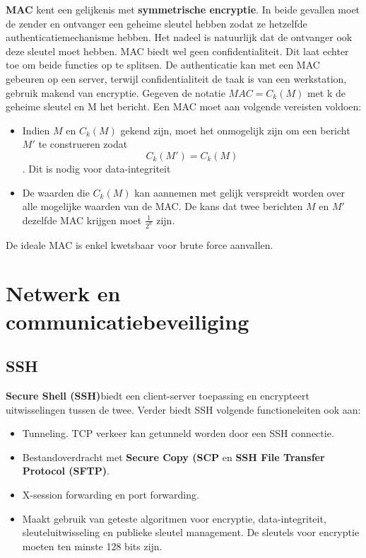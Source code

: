 	\textbf{MAC} kent een gelijkenis met \textbf{symmetrische encryptie}. In beide gevallen moet de zender en ontvanger een geheime sleutel hebben zodat ze hetzelfde authenticatiemechanisme hebben. Het nadeel is natuurlijk dat de ontvanger ook deze sleutel moet hebben. MAC biedt wel geen confidentialiteit. Dit laat echter toe om beide functies op te splitsen. De authenticatie kan met een MAC gebeuren op een server, terwijl confidentialiteit de taak is van een werkstation, gebruik makend van encryptie. Gegeven de notatie \textbf{$MAC = C_k(M)$} met k de geheime sleutel en M het bericht. Een MAC moet aan volgende vereisten voldoen:
	\begin{itemize}
		\item Indien $M$ en $C_k(M)$ gekend zijn, moet het onmogelijk zijn om een bericht $M'$ te construeren zodat \textbf{$$C_k(M') = C_k(M)$$}. Dit is nodig voor data-integriteit
		
		\item De waarden die $C_k(M)$ kan aannemen met gelijk verspreidt worden over alle mogelijke waarden van de MAC. De kans dat twee berichten $M$ en $M'$ dezelfde MAC krijgen moet $\frac{1}{2^n}$ zijn.
	\end{itemize}

	De ideale MAC is enkel kwetsbaar voor brute force aanvallen. 

	\chapter{Netwerk en communicatiebeveiliging}
	\section{SSH}
	\textbf{Secure Shell (SSH)}biedt een client-server toepassing en encrypteert uitwisselingen tussen de twee. Verder biedt SSH volgende functioneleiten ook aan:
	\begin{itemize}
		\item Tunneling. TCP verkeer kan getunneld worden door een SSH connectie.
		\item Bestandoverdracht met \textbf{Secure Copy (SCP} en \textbf{SSH File Transfer Protocol (SFTP)}.
		\item X-session forwarding en port forwarding.
		\item Maakt gebruik van geteste algoritmen voor encryptie, data-integriteit, sleuteluitwisseling en publieke sleutel management. De sleutels voor encryptie moeten ten minste 128 bits zijn.
	\end{itemize}
